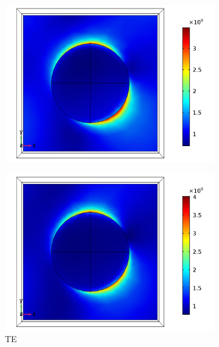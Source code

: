 \begin{figure}[htb!]
    \begin{subfigure}{0.32\textwidth}
        \centering
        \includegraphics[width=\linewidth]{figures/ch4/S5A/FieldDistribution/phi25/Sample5A_TE_Slice@z=0_wl=350_phi=25.png}
   \end{subfigure}
   \begin{subfigure}{0.32\textwidth}
        \centering
        \includegraphics[width=\linewidth]{figures/ch4/S5A/FieldDistribution/phi25/Sample5A_TE_Slice@z=0_wl=400_phi=25.png}
        \caption{TE}
        \vspace{-0.7cm}
   \end{subfigure}
   \begin{subfigure}{0.32\textwidth}

\end{subfigure}
\end{figure}
